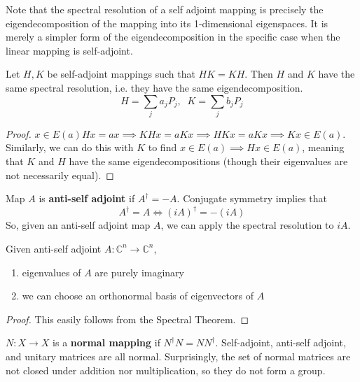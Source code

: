   Note that the spectral resolution of a self adjoint mapping is precisely the eigendecomposition of the mapping into its 1-dimensional eigenspaces. It is merely a simpler form of the eigendecomposition in the specific case when the linear mapping is self-adjoint. 

  \begin{theorem}
    Let $H, K$ be self-adjoint mappings such that $H K = K H$. Then $H$ and $K$ have the same spectral resolution, i.e. they have the same eigendecomposition. 
    \begin{equation}
      H = \sum_j a_j P_j, \; \; K = \sum_j b_j P_j
    \end{equation}
  \end{theorem}
  \begin{proof}
    $x \in E(a) H x = a x \implies K H x = a K x \implies H K x = a K x \implies K x \in E(a)$. Similarly, we can do this with $K$ to find $x \in E(a) \implies H x \in E(a)$, meaning that $K$ and $H$ have the same eigendecompositions (though their eigenvalues are not necessarily equal). 
  \end{proof}

  \begin{definition}
    Map $A$ is \textbf{anti-self adjoint} if $A^\dagger = - A$. Conjugate symmetry implies that
    \begin{equation}
      A^\dagger = A \iff (i A)^\dagger = - (i A)
    \end{equation}
    So, given an anti-self adjoint map $A$, we can apply the spectral resolution to $iA$. 
  \end{definition}

  \begin{theorem}
    Given anti-self adjoint $A: \mathbb{C}^n \longrightarrow \mathbb{C}^n$, 
    \begin{enumerate}
      \item eigenvalues of $A$ are purely imaginary
      \item we can choose an orthonormal basis of eigenvectors of $A$
    \end{enumerate}
  \end{theorem}
  \begin{proof}
    This easily follows from the Spectral Theorem. 
  \end{proof}

  \begin{definition}
    $N: X \longrightarrow X$ is a \textbf{normal mapping} if $N^\dagger N = N N^\dagger$. Self-adjoint, anti-self adjoint, and unitary matrices are all normal. Surprisingly, the set of normal matrices are not closed under addition nor multiplication, so they do not form a group. 
  \end{definition}

